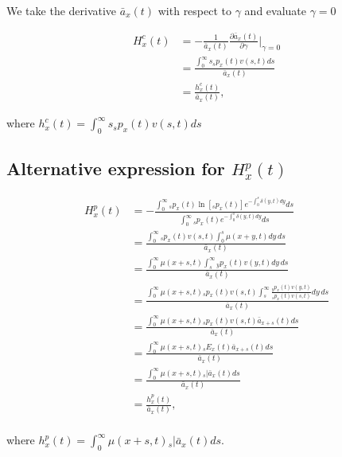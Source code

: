 \documentclass[12pt]{article}
\begin{document}
We take the derivative $\bar{a}_{x}(t)$ with respect to $\gamma$ and evaluate $\gamma=0$


\begin{equation}\label{eq:EntropyConst3}
\begin{split}
{H}^{c}_x(t)&=-\frac{1}{\bar{a}_x(t)}\frac{\partial \bar{a}_x(t)}{\partial \gamma} \bigg\rvert_{\gamma=0}\\
&= \frac{\int_0^\infty s {}_sp_x(t) {v}(s,t)ds}{\bar{a}_x(t)} \\
&= \frac{{h}^{c}_x(t)}{\bar{a}_x(t)},
\end{split}
\end{equation}

where ${h}^{c}_x(t)=\int_0^\infty s {}_sp_x(t) {v}(s,t)ds$



\subsection{Alternative expression for ${H}^{p}_{x}(t)$}

\begin{equation} \label{eq:EntropyAnnuityA1}
\begin{split}
{H}^{p}_{x}(t) &= -\frac{ \int_{0}^{\infty}{}_sp_x(t)\ln[{}_sp_x(t)] e^{-\int_{0}^{s}\delta(y,t)dy} ds}{\int_0^\infty {}_sp_x(t) e^{-\int_{0}^{s}\delta(y,t)dy} ds}\\
&= \frac{\int_0^\infty {}_sp_x(t) {v}(s,t) \int_0^s \mu(x+y,t) dy\,ds}{\bar{a}_x(t)}\\
&= \frac{\int_0^\infty  \mu(x+s,t) \int_s^\infty {}_yp_x(t) {v}(y,t)  dy\,ds}{\bar{a}_x(t)}\\
&= \frac{\int_0^\infty  \mu(x+s,t)  {}_sp_x(t) {v}(s,t) \int_s^\infty \frac{ {}_yp_x(t) {v}(y,t)}{ {}_sp_x(t) {v}(s,t)}  dy\,ds}{\bar{a}_x(t)}\\
&=  \frac{\int_0^\infty \mu(x+s,t)   {}_sp_x(t) {v}(s,t) \bar{a}_{x+s}(t) ds}{\bar{a}_x(t)} \\
&=  \frac{\int_0^\infty \mu(x+s,t)   {}_sE_x(t) \bar{a}_{x+s}(t) ds}{\bar{a}_x(t)} \\
&=  \frac{\int_0^\infty \mu(x+s,t)   {}_s|\bar{a}_x(t) ds}{\bar{a}_x(t)} \\
&=  \frac{{h}^{p}_{x}(t)}{\bar{a}_x(t)}, \\
\end{split}
\end{equation}

where ${h}^{p}_{x}(t)=\int_0^\infty \mu(x+s,t)   {}_s|\bar{a}_x(t) ds$.
\end{document}
